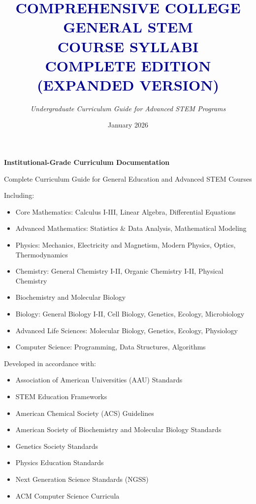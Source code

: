 \documentclass[12pt,oneside]{book}
\title{\textcolor{darkblue}{\textbf{COMPREHENSIVE COLLEGE GENERAL STEM \\ COURSE SYLLABI \\ COMPLETE EDITION \\ (EXPANDED VERSION)}}}
\author{\textit{Undergraduate Curriculum Guide for Advanced STEM Programs}}
\date{January 2026}
\begin{document}
\maketitle

\newpage

\vspace*{\fill}
\noindent
\textbf{Institutional-Grade Curriculum Documentation}

\noindent
Complete Curriculum Guide for General Education and Advanced STEM Courses

\noindent
Including:
\begin{itemize}
    \item Core Mathematics: Calculus I-III, Linear Algebra, Differential Equations
    \item Advanced Mathematics: Statistics \& Data Analysis, Mathematical Modeling
    \item Physics: Mechanics, Electricity and Magnetism, Modern Physics, Optics, Thermodynamics
    \item Chemistry: General Chemistry I-II, Organic Chemistry I-II, Physical Chemistry
    \item Biochemistry and Molecular Biology
    \item Biology: General Biology I-II, Cell Biology, Genetics, Ecology, Microbiology
    \item Advanced Life Sciences: Molecular Biology, Genetics, Ecology, Physiology
    \item Computer Science: Programming, Data Structures, Algorithms
\end{itemize}

\noindent
Developed in accordance with:
\begin{itemize}
    \item Association of American Universities (AAU) Standards
    \item STEM Education Frameworks
    \item American Chemical Society (ACS) Guidelines
    \item American Society of Biochemistry and Molecular Biology Standards
    \item Genetics Society Standards
    \item Physics Education Standards
    \item Next Generation Science Standards (NGSS)
    \item ACM Computer Science Curricula
\end{itemize}

\vspace{\fill}
\end{document}
